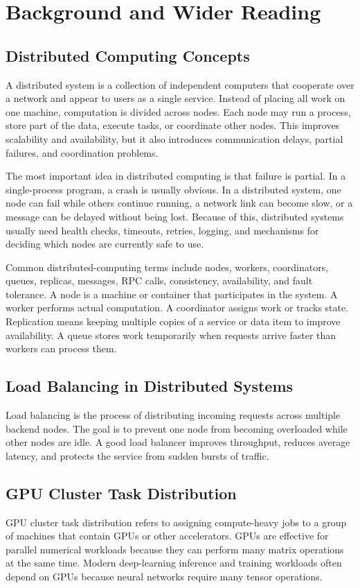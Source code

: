 \section{Background and Wider Reading}

\subsection{Distributed Computing Concepts}
A distributed system is a collection of independent computers that cooperate over a network and appear to users as a single service. Instead of placing all work on one machine, computation is divided across nodes. Each node may run a process, store part of the data, execute tasks, or coordinate other nodes. This improves scalability and availability, but it also introduces communication delays, partial failures, and coordination problems.

The most important idea in distributed computing is that failure is partial. In a single-process program, a crash is usually obvious. In a distributed system, one node can fail while others continue running, a network link can become slow, or a message can be delayed without being lost. Because of this, distributed systems usually need health checks, timeouts, retries, logging, and mechanisms for deciding which nodes are currently safe to use.

Common distributed-computing terms include nodes, workers, coordinators, queues, replicas, messages, RPC calls, consistency, availability, and fault tolerance. A node is a machine or container that participates in the system. A worker performs actual computation. A coordinator assigns work or tracks state. Replication means keeping multiple copies of a service or data item to improve availability. A queue stores work temporarily when requests arrive faster than workers can process them.

\subsection{Load Balancing in Distributed Systems}
Load balancing is the process of distributing incoming requests across multiple backend nodes. The goal is to prevent one node from becoming overloaded while other nodes are idle. A good load balancer improves throughput, reduces average latency, and protects the service from sudden bursts of traffic.

\subsection{GPU Cluster Task Distribution}
GPU cluster task distribution refers to assigning compute-heavy jobs to a group of machines that contain GPUs or other accelerators. GPUs are effective for parallel numerical workloads because they can perform many matrix operations at the same time. Modern deep-learning inference and training workloads often depend on GPUs because neural networks require many tensor operations.


